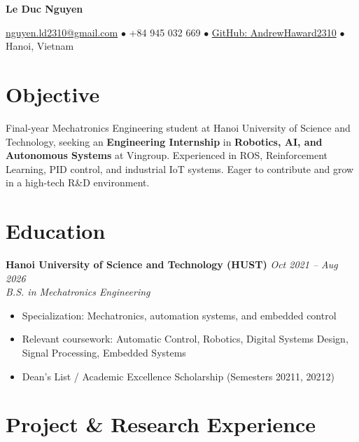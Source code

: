 \documentclass[11pt,a4paper]{article}
\newcommand{\cvname}[1]{
  \centerline{\LARGE\textbf{#1}}
  \vspace{0.3em}
}
\newcommand{\cvcontact}[1]{
  \centerline{\small #1}
}
\newcommand{\cventry}[4]{
  \noindent\textbf{#1} \hfill \textit{#2} \\
  \textit{#3} \\
  #4
  \vspace{0.4em}
}
\begin{document}
\cvname{Le Duc Nguyen}

\cvcontact{
  \href{mailto:nguyen.ld2310@gmail.com}{nguyen.ld2310@gmail.com}
  \quad $\bullet$ \quad +84 945 032 669
  \quad $\bullet$ \quad \href{https://github.com/AndrewHaward2310}{GitHub: AndrewHaward2310}
  \quad $\bullet$ \quad Hanoi, Vietnam
}

\vspace{0.5em}

\section{Objective}

Final-year Mechatronics Engineering student at Hanoi University of Science and Technology, seeking an \textbf{Engineering Internship} in \textbf{Robotics, AI, and Autonomous Systems} at Vingroup. Experienced in ROS, Reinforcement Learning, PID control, and industrial IoT systems. Eager to contribute and grow in a high-tech R\&D environment.

\section{Education}

\cventry
  {Hanoi University of Science and Technology (HUST)}
  {Oct 2021 -- Aug 2026}
  {B.S. in Mechatronics Engineering}
  {
    \begin{itemize}[leftmargin=1.5em, topsep=0pt, itemsep=0.15em]
      \item Specialization: Mechatronics, automation systems, and embedded control
      \item Relevant coursework: Automatic Control, Robotics, Digital Systems Design, Signal Processing, Embedded Systems
      \item Dean's List / Academic Excellence Scholarship (Semesters 20211, 20212)
    \end{itemize}
  }

\section{Project \& Research Experience}
\end{document}
